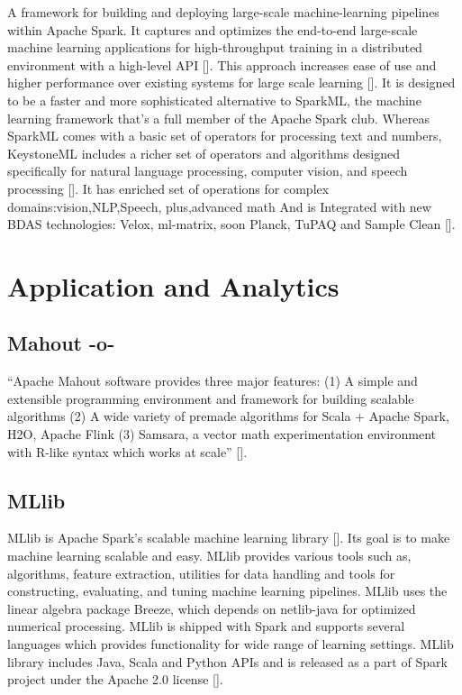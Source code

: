 A framework for building and deploying large-scale machine-learning
pipelines within Apache Spark. It captures and optimizes the
end-to-end large-scale machine learning applications for
high-throughput training in a distributed environment with a
high-level API [\cite{sparks2016keystoneml}]. This approach increases
ease of use and higher performance over existing systems for large
scale learning [\cite{sparks2016keystoneml}]. It is designed to be a
faster and more sophisticated alternative to SparkML, the machine
learning framework that's a full member of the Apache Spark
club. Whereas SparkML comes with a basic set of operators for
processing text and numbers, KeystoneML includes a richer set of
operators and algorithms designed specifically for natural language
processing, computer vision, and speech processing [\cite{building}]. It
has enriched set of operations for complex domains:vision,NLP,Speech,
plus,advanced math And is Integrated with new BDAS technologies:
Velox, ml-matrix, soon Planck, TuPAQ and Sample Clean [\cite{spark}].

\section{Application and Analytics}

\subsection{Mahout -o-}

``Apache Mahout software provides three major features: (1) A simple
and extensible programming environment and framework for building
scalable algorithms (2) A wide variety of premade algorithms for Scala
+ Apache Spark, H2O, Apache Flink (3) Samsara, a vector math
experimentation environment with R-like syntax which works at
scale'' [\cite{www-mahout}].




\subsection{MLlib}

MLlib is Apache Spark's scalable machine learning
library [\cite{www-mllib}]. Its goal is to make machine learning
scalable and easy. MLlib provides various tools such as, algorithms,
feature extraction, utilities for data handling and tools for
constructing, evaluating, and tuning machine learning pipelines. MLlib
uses the linear algebra package Breeze, which depends on netlib-java
for optimized numerical processing. MLlib is shipped with Spark and
supports several languages which provides functionality for wide range
of learning settings. MLlib library includes Java, Scala and Python
APIs and is released as a part of Spark project under the Apache 2.0
license [\cite{MLlib-article}].

